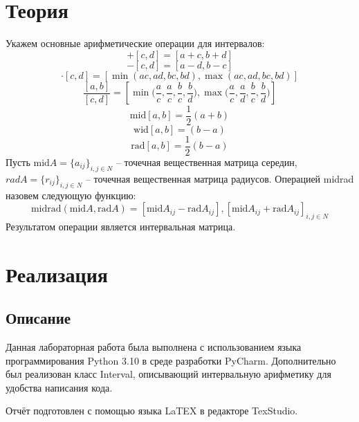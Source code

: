 \documentclass[a4paper,14pt]{article}
\begin{document}
	\section{Теория}
	Укажем основные арифметические операции для интервалов:
	\begin{equation}
		[a, b] + [c, d] = [a+c, b+d]
	\end{equation}
	\begin{equation}
		[a, b] - [c, d] = [a-d, b-c]
	\end{equation}
	\begin{equation}
	    [a, b] \cdot [c, d] = [\min(ac, ad, bc, bd), \max(ac, ad, bc, bd)]
	\end{equation}
	\begin{equation}
	    \frac{[a,b]}{[c,d]}=[\min\Big(\frac{a}{c}, \frac{a}{c}, \frac{b}{c}, \frac{b}{d}\Big), \max\Big(\frac{a}{c}, \frac{a}{d}, \frac{b}{c}, \frac{b}{d}\Big)]
	\end{equation}
	\begin{equation}
	   \text{mid}[a,b] = \frac{1}{2}(a+b)
	\end{equation}
	\begin{equation}
		\text{wid}[a,b] = (b-a)
	\end{equation}
	\begin{equation}
		\text{rad}[a,b] = \frac{1}{2}(b-a)
	\end{equation}
	Пусть $\text{mid} A = \{a_{ij} \}_{i,j \in N}$ – точечная вещественная матрица середин, $rad A = \{r_{ij}\}_{i,j \in N}$ – точечная вещественная матрица радиусов. Операцией midrad назовем следующую функцию:
	\begin{equation}
		\text{midrad}(\text{mid}A, \text{rad}A) = {[\text{mid}A_{ij} - \text{rad} A_{ij} ], [\text{mid} A_{ij} + \text{rad} A_{ij} ]}_{i,j \in N}
	\end{equation}
	Результатом операции является интервальная матрица.
	\section{Реализация}
	\subsection{Описание}
	Данная лабораторная работа была выполнена с использованием языка
	программирования Python 3.10 в среде разработки PyCharm.
	Дополнительно был реализован класс Interval, описывающий интервальную арифметику для удобства написания кода. 
	
	Отчёт подготовлен с помощью языка LaTEX в редакторе TexStudio.
\end{document}
